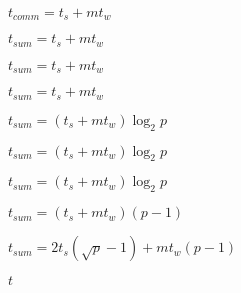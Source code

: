 \documentclass[10pt]{book}
\begin{document}
\begin{mdSnippets}
\begin{mdInlineSnippet}%
$t_{comm} = t_s + mt_w$\end{mdInlineSnippet}%
\begin{mdInlineSnippet}[10819d45a6f11b738122f5fb8de9b0d8]%
$t_{sum} = t_s + mt_w$\end{mdInlineSnippet}%
\begin{mdInlineSnippet}[10819d45a6f11b738122f5fb8de9b0d8]%
$t_{sum} = t_s + mt_w$\end{mdInlineSnippet}%
\begin{mdInlineSnippet}[10819d45a6f11b738122f5fb8de9b0d8]%
$t_{sum} = t_s + mt_w$\end{mdInlineSnippet}%
\begin{mdInlineSnippet}%
$t_{sum} = (t_s + mt_w) \log _2 p$\end{mdInlineSnippet}%
\begin{mdInlineSnippet}%
$t_{sum} = (t_s + mt_w) \log _2 p$\end{mdInlineSnippet}%
\begin{mdInlineSnippet}%
$t_{sum} = (t_s + mt_w) \log _2 p$\end{mdInlineSnippet}%
\begin{mdInlineSnippet}[76ecbdcc60db753d50e0f54442684a1f]%
$t_{sum} = (t_s + mt_w)(p - 1)$\end{mdInlineSnippet}%
\begin{mdInlineSnippet}[9f1e04740609c172e554c5544a2e4175]%
$t_{sum} = 2t_s(\sqrt {p} - 1) + mt_w(p  - 1)$\end{mdInlineSnippet}%
\begin{mdInlineSnippet}[e358efa489f58062f10dd7316b65649e]%
$t$\end{mdInlineSnippet}%

\end{mdSnippets}
\end{document}
